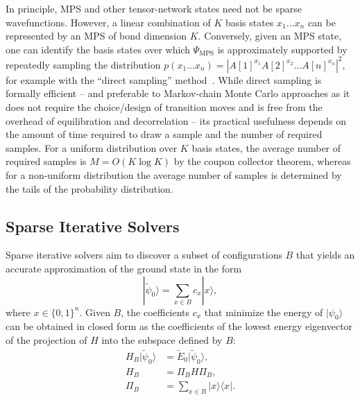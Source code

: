 \documentclass[
  reprint,            %
  amsmath,amssymb,
  aps,
  superscriptaddress, %
  longbibliography
]{revtex4-2}
\theoremstyle{definition}
\begin{document}
In principle, MPS and other tensor-network states need not be sparse wavefunctions. However, a linear combination of $K$ basis states $x_1 \dots x_n$ can be represented by an MPS of bond dimension $K$.
Conversely, given an MPS state, one can identify the basis states over which $\Psi_{\mathrm{MPS}}$ is approximately supported by repeatedly sampling the distribution $p(x_1 \dots x_n) = | A[1]^{x_1} A[2]^{x_2} \dots A[n]^{x_n} |^2$, for example with the ``direct sampling'' method~\cite{ferris2012perfect}.
While direct sampling is formally efficient -- and preferable to Markov-chain Monte Carlo approaches as it does not require the choice/design of transition moves and is free from the overhead of equilibration and decorrelation -- its practical usefulness depends on the amount of time required to draw a sample and the number of required samples. For a uniform distribution over $K$ basis states, the average number of required samples is $M = O(K \log K)$ by the coupon collector theorem, whereas for a non-uniform distribution the average number of samples is determined by the tails of the probability distribution.


\subsection{Sparse Iterative Solvers}

Sparse iterative solvers aim to discover a subset of configurations $B$ that yields an accurate approximation of the ground state in the form
\begin{equation}
    |\tilde{\psi}_0\rangle = \sum_{x \in B} c_x | x\rangle,
\end{equation}
where $x\in\{0, 1\}^n$. Given $B$, the coefficients $c_x$ that minimize the energy of $|\psi_0\rangle$ can be obtained in closed form as the coefficients of the lowest energy eigenvector of the projection of $H$ into the subspace defined by $B$:
\begin{equation}
\begin{split}
    H_B  |\tilde{\psi}_0\rangle & = \tilde{E}_0  |\tilde{\psi}_0\rangle,\\
    H_B & = \Pi_B H \Pi_B, \\
    \Pi_B & = \sum_{x\in B} |x\rangle \langle x|.
\end{split}
\end{equation}
\end{document}

